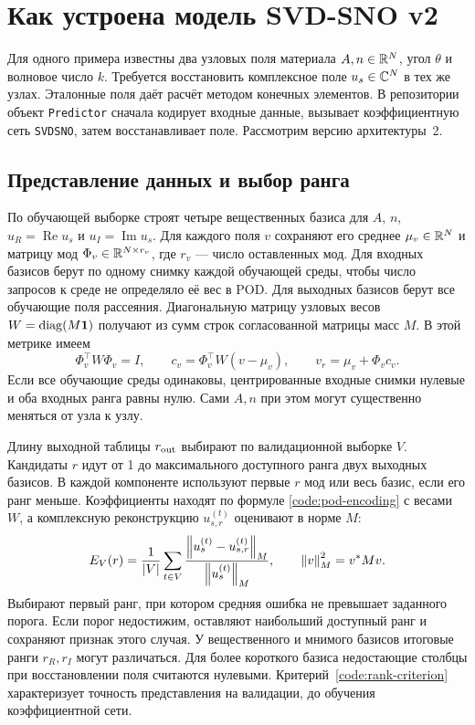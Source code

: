 \chapter{Как устроена модель SVD-SNO v2}
\label{code:implementation}

Для одного примера известны два узловых поля материала $A,n\in\mathbb{R}^N$,
угол $\theta$ и волновое число $k$. Требуется восстановить комплексное
поле $u_s\in\mathbb{C}^N$ в тех же узлах. Эталонные поля даёт расчёт методом
конечных элементов. В репозитории объект \texttt{Predictor} сначала
кодирует входные данные, вызывает коэффициентную сеть \texttt{SVDSNO},
затем восстанавливает поле. Рассмотрим версию архитектуры~2.

\section{Представление данных и выбор ранга}
\label{code:preprocessing}

По обучающей выборке строят четыре вещественных базиса для $A$, $n$,
$u_R=\operatorname{Re}u_s$ и $u_I=\operatorname{Im}u_s$.
Для каждого поля $v$ сохраняют его среднее $\mu_v\in\mathbb{R}^N$ и матрицу
мод $\Phi_v\in\mathbb{R}^{N\times r_v}$, где $r_v$ --- число оставленных мод.
Для входных базисов берут по одному снимку каждой обучающей среды,
чтобы число запросов к среде не определяло её вес в POD. Для выходных
базисов берут все обучающие поля рассеяния. Диагональную матрицу узловых
весов $W=\operatorname{diag}(M\bm 1)$ получают из сумм строк согласованной матрицы
масс $M$. В этой метрике имеем
\begin{equation}
 \Phi_v^\top W\Phi_v=I,\qquad
 c_v=\Phi_v^\top W(v-\mu_v),\qquad
 v_r=\mu_v+\Phi_v c_v .
 \label{code:pod-encoding}
\end{equation}
Если все обучающие среды одинаковы, центрированные входные снимки
нулевые и оба входных ранга равны нулю. Сами $A,n$ при этом могут
существенно меняться от узла к узлу.

Длину выходной таблицы $r_{\rm out}$ выбирают по валидационной выборке
$V$. Кандидаты $r$ идут от 1 до максимального доступного ранга двух
выходных базисов. В каждой компоненте используют первые $r$ мод или
весь базис, если его ранг меньше. Коэффициенты находят по формуле
\eqref{code:pod-encoding} с весами $W$, а комплексную реконструкцию
$u^{(t)}_{s,r}$ оценивают в норме $M$:
\begin{equation}
 E_V(r)=\frac{1}{|V|}\sum_{t\in V}
 \frac{\left\lVert u_s^{(t)}-u^{(t)}_{s,r}\right\rVert_M}{\left\lVert u_s^{(t)}\right\rVert_M},
 \qquad \left\lVert v\right\rVert_M^2=v^*Mv .
 \label{code:rank-criterion}
\end{equation}
Выбирают первый ранг, при котором средняя ошибка не превышает
заданного порога. Если порог недостижим, оставляют наибольший доступный
ранг и сохраняют признак этого случая. У вещественного и мнимого
базисов итоговые ранги $r_R,r_I$ могут различаться. Для более короткого
базиса недостающие столбцы при восстановлении поля считаются нулевыми.
Критерий~\eqref{code:rank-criterion} характеризует точность представления
на валидации, до обучения коэффициентной сети.

